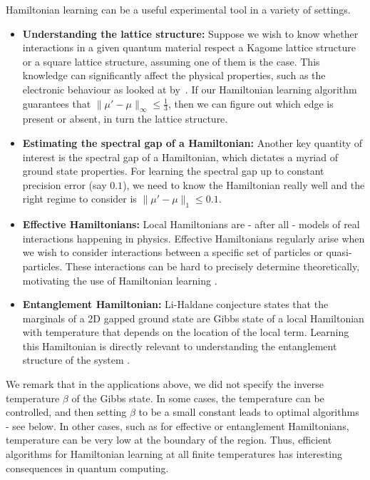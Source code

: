 \documentclass[11pt]{article}
\begin{document}
Hamiltonian learning can be a useful experimental tool in a variety of settings.
\begin{itemize}
    \item \textbf{Understanding the lattice structure:} Suppose we wish to know whether interactions in a given quantum material respect a Kagome lattice structure or a square lattice structure, assuming one of them is the case. This knowledge can significantly affect the physical properties, such as the electronic behaviour as looked at by~\cite{Jiang21}. If our Hamiltonian learning algorithm guarantees that $\|\mu'-\mu\|_\infty\leq \frac{1}{3}$, then we can figure out which edge is present or absent, in turn the lattice structure.
    \item 
    \textbf{Estimating the spectral gap of a Hamiltonian:} Another key quantity of interest is the spectral gap of a Hamiltonian, which dictates a myriad of ground state properties. For learning the spectral gap up to  constant precision error (say $0.1$), we need to know the Hamiltonian really well and the right regime to consider is $\|\mu'-\mu\|_1\leq 0.1$.  
    \item 
    \textbf{Effective Hamiltonians:} Local Hamiltonians are - after all - models of real interactions happening in physics. Effective Hamiltonians regularly arise when we wish to consider interactions between a specific set of particles or quasi-particles. These interactions can be hard to precisely determine theoretically, motivating the use of Hamiltonian learning \cite{SHBSGB22}. 
    \item 
    \textbf{Entanglement Hamiltonian:} Li-Haldane conjecture states that the marginals of a 2D gapped ground state are Gibbs state of a local Hamiltonian with temperature that depends on the location of the local term. Learning this Hamiltonian is directly relevant to understanding the entanglement structure of the system \cite{Kokail2021}. 
\end{itemize}

We remark that in the applications above, we did not specify the inverse temperature $\beta$ of the Gibbs state. In some cases, the temperature can be controlled, and then setting $\beta$ to be a small constant leads to optimal algorithms - see below. In other cases, such as for effective or entanglement Hamiltonians, temperature can be very low at the boundary of the region. Thus, efficient algorithms for Hamiltonian learning at all finite temperatures has interesting consequences in quantum computing. 
\end{document}
